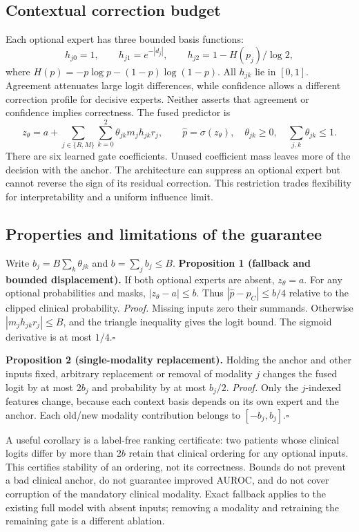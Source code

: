 \documentclass[runningheads]{llncs}
\begin{document}
\subsection{Contextual correction budget}
Each optional expert has three bounded basis functions:
\begin{equation}
 h_{j0}=1,\qquad h_{j1}=e^{-|d_j|},\qquad
 h_{j2}=1-H(p_j)/\log 2,
\end{equation}
where $H(p)=-p\log p-(1-p)\log(1-p)$. All $h_{jk}$ lie in $[0,1]$. Agreement attenuates large logit differences, while confidence allows a different correction profile for decisive experts. Neither asserts that agreement or confidence implies correctness.
The fused predictor is
\begin{equation}
 z_\theta=a+\sum_{j\in\{R,M\}}\sum_{k=0}^{2}
 \theta_{jk}m_jh_{jk}r_j,\qquad
 \hat p=\sigma(z_\theta),\quad
 \theta_{jk}\geq0,\quad\sum_{j,k}\theta_{jk}\leq1.
 \label{eq:carf}
\end{equation}
There are six learned gate coefficients. Unused coefficient mass leaves more of the decision with the anchor. The architecture can suppress an optional expert but cannot reverse the sign of its residual correction. This restriction trades flexibility for interpretability and a uniform influence limit.

\subsection{Properties and limitations of the guarantee}
Write $b_j=B\sum_k\theta_{jk}$ and $b=\sum_j b_j\leq B$.
\textbf{Proposition 1 (fallback and bounded displacement).} If both optional experts are absent, $z_\theta=a$. For any optional probabilities and masks, $|z_\theta-a|\leq b$. Thus $|\hat p-p_C|\leq b/4$ relative to the clipped clinical probability.
\emph{Proof.} Missing inputs zero their summands. Otherwise $|m_jh_{jk}r_j|\leq B$, and the triangle inequality gives the logit bound. The sigmoid derivative is at most $1/4$.\hfill$\square$

\textbf{Proposition 2 (single-modality replacement).} Holding the anchor and other inputs fixed, arbitrary replacement or removal of modality $j$ changes the fused logit by at most $2b_j$ and probability by at most $b_j/2$.
\emph{Proof.} Only the $j$-indexed features change, because each context basis depends on its own expert and the anchor. Each old/new modality contribution belongs to $[-b_j,b_j]$.\hfill$\square$

A useful corollary is a label-free ranking certificate: two patients whose clinical logits differ by more than $2b$ retain that clinical ordering for any optional inputs. This certifies stability of an ordering, not its correctness. Bounds do not prevent a bad clinical anchor, do not guarantee improved AUROC, and do not cover corruption of the mandatory clinical modality. Exact fallback applies to the existing full model with absent inputs; removing a modality and retraining the remaining gate is a different ablation.
\end{document}
